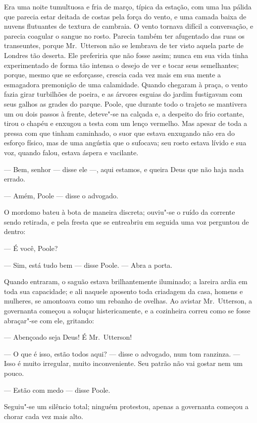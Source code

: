 Era uma noite tumultuosa e fria de março, típica da estação, com uma lua
pálida que parecia estar deitada de costas pela força do vento, e uma
camada baixa de nuvens flutuantes de textura de cambraia.  O vento
tornava difícil a conversação, e parecia coagular o sangue no rosto. 
Parecia também ter afugentado das ruas os transeuntes, porque 
Mr.~Utterson não se lembrava de ter visto aquela parte de Londres tão
deserta.  Ele preferiria que não fosse assim; nunca em sua vida tinha
experimentado de forma tão intensa o desejo de ver e tocar seus
semelhantes; porque, mesmo que se esforçasse, crescia cada vez mais
em sua mente a esmagadora premonição de uma calamidade.  Quando
chegaram à praça, o vento fazia girar turbilhões de poeira, e as
árvores esguias do jardim fustigavam com seus galhos as grades do
parque.  Poole, que durante todo o trajeto se mantivera um ou dois
passos à frente, deteve"-se na calçada e, a despeito do frio cortante,
tirou o chapéu e enxugou a testa com um lenço vermelho.  Mas apesar de
toda a pressa com que tinham caminhado, o suor que estava enxugando não
era do esforço físico, mas de uma angústia que o sufocava; seu rosto
estava lívido e sua voz, quando falou, estava áspera e vacilante.

--- Bem, senhor --- disse ele ---, aqui estamos, e queira Deus que não haja
nada errado.

--- Amém, Poole --- disse o advogado.

O mordomo bateu à bota de maneira discreta; ouviu"-se o ruído da corrente
sendo retirada, e pela fresta que se entreabriu em seguida uma voz
perguntou de dentro:

--- É você, Poole? 

--- Sim, está tudo bem --- disse Poole. --- Abra a porta.

Quando entraram, o saguão estava brilhantemente iluminado; a lareira
ardia em toda sua capacidade; e ali naquele aposento toda criadagem da
casa, homens e mulheres, se amontoava como um rebanho de ovelhas.  Ao
avistar Mr.~Utterson, a governanta começou a soluçar histericamente, e
a cozinheira correu como se fosse abraçar"-se com ele, gritando:

--- Abençoado seja Deus!  É Mr.~Utterson!

--- O que é isso, estão todos aqui? --- disse o advogado, num tom
ranzinza. --- Isso é muito irregular, muito inconveniente. Seu patrão
não vai gostar nem um pouco.

--- Estão com medo --- disse Poole.

Seguiu"-se um silêncio total; ninguém protestou, apenas a governanta
começou a chorar cada vez mais alto.

